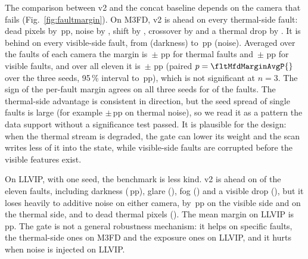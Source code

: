 The comparison between v2 and the concat baseline depends on the camera that fails (Fig.~\ref{fig:faultmargin}). On M3FD, v2 is ahead on every thermal-side fault: dead pixels by \fltMfdMarginThermalDeadSevThreeMeanMap{}\,pp, noise by \fltMfdMarginThermalNoiseSevThreeMeanMap{}, shift by \fltMfdMarginThermalShiftSevThreeMeanMap{}, crossover by \fltMfdMarginThermalCrossoverSevThreeMeanMap{} and a thermal drop by \fltMfdMarginThermalDropSevThreeMeanMap{}. It is behind on every visible-side fault, from \fltMfdMarginVisibleDarkSevThreeMeanMap{} (darkness) to \fltMfdMarginVisibleNoiseSevThreeMeanMap{}\,pp (noise). Averaged over the faults of each camera the margin is \fltMfdMarginMeanThermalAvgSevThreeMap{}\,$\pm$\,\fltMfdMarginStdThermalAvgSevThreeMap{}\,pp for thermal faults and \fltMfdMarginMeanVisibleAvgSevThreeMap{}\,$\pm$\,\fltMfdMarginStdVisibleAvgSevThreeMap{}\,pp for visible faults, and over all eleven it is \fltMfdMarginMeanAvgSevThreeMap{}\,$\pm$\,\fltMfdMarginStdAvgSevThreeMap{}\,pp (paired $p=\fltMfdMarginAvgP{}$ over the three seeds, 95\,\% interval \fltMfdMarginAvgCiLow{} to \fltMfdMarginAvgCiHigh{}\,pp), which is not significant at $n=3$. The sign of the per-fault margin agrees on all three seeds for \fltMfdSignAgreeSevThree{} of the \fltMfdFaultCount{} faults. The thermal-side advantage is consistent in direction, but the seed spread of single faults is large (for example $\pm$\fltMfdMarginThermalNoiseSevThreeStdMap{}\,pp on thermal noise), so we read it as a pattern the data support without a significance test passed. It is plausible for the design: when the thermal stream is degraded, the gate can lower its weight and the scan writes less of it into the state, while visible-side faults are corrupted before the visible features exist.

On LLVIP, with one seed, the benchmark is less kind. v2 is ahead on \fltLlvipWinsSevThree{} of the eleven faults, including darkness (\fltLlvipMarginVisibleDarkSevThreeMap{}\,pp), glare (\fltLlvipMarginVisibleGlareSevThreeMap{}), fog (\fltLlvipMarginVisibleFogSevThreeMap{}) and a visible drop (\fltLlvipMarginVisibleDropSevThreeMap{}), but it loses heavily to additive noise on either camera, by \fltLlvipMarginVisibleNoiseSevThreeMap{}\,pp on the visible side and \fltLlvipMarginThermalNoiseSevThreeMap{} on the thermal side, and to dead thermal pixels (\fltLlvipMarginThermalDeadSevThreeMap{}). The mean margin on LLVIP is \fltLlvipMarginAvgSevThreeMap{}\,pp. The gate is not a general robustness mechanism: it helps on specific faults, the thermal-side ones on M3FD and the exposure ones on LLVIP, and it hurts when noise is injected on LLVIP.

